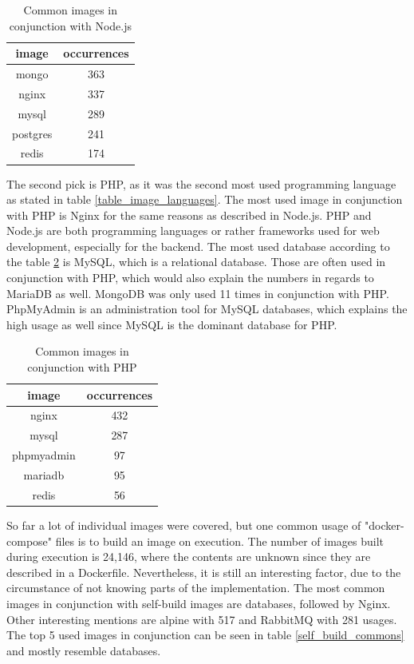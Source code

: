 \begin{table}[h!]
    \centering
    \begin{tabular}{ |c|c| }
    \hline
    image & occurrences \\
    \hline
         mongo & 363 \\
         nginx & 337 \\
         mysql & 289 \\
         postgres & 241 \\
         redis & 174 \\
    \hline
    \end{tabular}
    \caption{Common images in conjunction with Node.js}
    \label{node_commons}
\end{table}

The second pick is PHP, as it was the second most used programming language as stated in table \ref{table_image_languages}. The most used image in conjunction with PHP is Nginx for the same reasons as described in Node.js. PHP and Node.js are both programming languages or rather frameworks used for web development, especially for the backend. The most used database according to the table \ref{php_commons} is MySQL, which is a relational database. Those are often used in conjunction with PHP, which would also explain the numbers in regards to MariaDB as well. MongoDB was only used 11 times in conjunction with PHP. PhpMyAdmin is an administration tool for MySQL databases, which explains the high usage as well since MySQL is the dominant database for PHP.

\begin{table}[h!]
    \centering
    \begin{tabular}{ |c|c| }
    \hline
    image & occurrences \\
    \hline
         nginx & 432 \\
         mysql & 287 \\
         phpmyadmin & 97 \\
         mariadb & 95 \\
         redis & 56 \\
    \hline
    \end{tabular}
    \caption{Common images in conjunction with PHP}
    \label{php_commons}
\end{table}

So far a lot of individual images were covered, but one common usage of "docker-compose" files is to build an image on execution. The number of images built during execution is 24,146, where the contents are unknown since they are described in a Dockerfile. Nevertheless, it is still an interesting factor, due to the circumstance of not knowing parts of the implementation. The most common images in conjunction with self-build images are databases, followed by Nginx. Other interesting mentions are alpine with 517 and RabbitMQ with 281 usages. The top 5 used images in conjunction can be seen in table \ref{self_build_commons} and mostly resemble databases.

